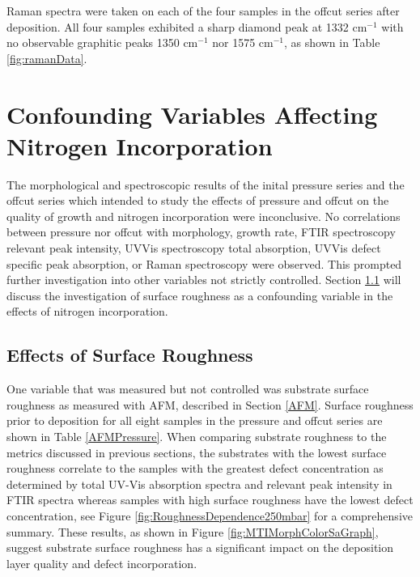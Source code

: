 Raman spectra were taken on each of the four samples in the offcut series after deposition. All four samples exhibited a sharp diamond peak at 1332 cm$^{-1}$ with no observable graphitic peaks 1350 cm$^{-1}$ nor 1575 cm$^{-1}$, as shown in Table \ref{fig:ramanData}. 

\section{Confounding Variables Affecting Nitrogen Incorporation}
\indent

The morphological and spectroscopic results of the inital pressure series and the offcut series which intended to study the effects of pressure and offcut on the quality of growth and nitrogen incorporation were inconclusive. No correlations between pressure nor offcut with morphology, growth rate, FTIR spectroscopy relevant peak intensity, UVVis spectroscopy total absorption, UVVis defect specific peak absorption, or Raman spectroscopy were observed. This prompted further investigation into other variables not strictly controlled. Section \ref{RoughnessEffects} will discuss the investigation of surface roughness as a confounding variable in the effects of nitrogen incorporation.

\subsection{Effects of Surface Roughness}
\label{RoughnessEffects}
\indent

One variable that was measured but not controlled was substrate surface roughness as measured with AFM, described in Section \ref{AFM}. Surface roughness prior to deposition for all eight samples in the pressure and offcut series are shown in Table \ref{AFMPressure}. When comparing substrate roughness to the metrics discussed in previous sections, the substrates with the lowest surface roughness correlate to the samples with the greatest defect concentration as determined by total UV-Vis absorption spectra and relevant peak intensity in FTIR spectra whereas samples with high surface roughness have the lowest defect concentration, see Figure \ref{fig:RoughnessDependence250mbar} for a comprehensive summary. These results, as shown in Figure \ref{fig:MTIMorphColorSaGraph}, suggest substrate surface roughness has a significant impact on the deposition layer quality and defect incorporation.
	
